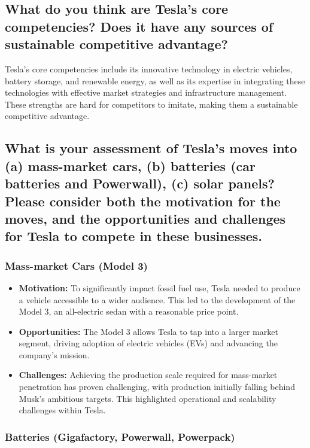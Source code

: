 \documentclass[UTF8,a4paper,AutoFakeBold,AutoFakeSlant]{article}
\begin{document}
\subsection{What do you think are Tesla’s core competencies? Does it have any sources of sustainable competitive advantage?}

Tesla's core competencies include its innovative technology in electric vehicles, battery storage, and renewable energy, as well as its expertise in integrating these technologies with effective market strategies and infrastructure management. These strengths are hard for competitors to imitate, making them a sustainable competitive advantage. 


\subsection{What is your assessment of Tesla’s moves into (a) mass-market cars, (b) batteries (car batteries and Powerwall), (c) solar panels? Please consider both the motivation for the moves, and the opportunities and challenges for Tesla to compete in these businesses.}

\subsubsection{Mass-market Cars (Model 3)}

\begin{itemize}
\item \textbf{Motivation:} To significantly impact fossil fuel use, Tesla needed to produce a vehicle accessible to a wider audience. This led to the development of the Model 3, an all-electric sedan with a reasonable price point.
\item \textbf{Opportunities:} The Model 3 allows Tesla to tap into a larger market segment, driving adoption of electric vehicles (EVs) and advancing the company's mission.
\item \textbf{Challenges:} Achieving the production scale required for mass-market penetration has proven challenging, with production initially falling behind Musk's ambitious targets. This highlighted operational and scalability challenges within Tesla.
\end{itemize}

\subsubsection{Batteries (Gigafactory, Powerwall, Powerpack)}
\end{document}
